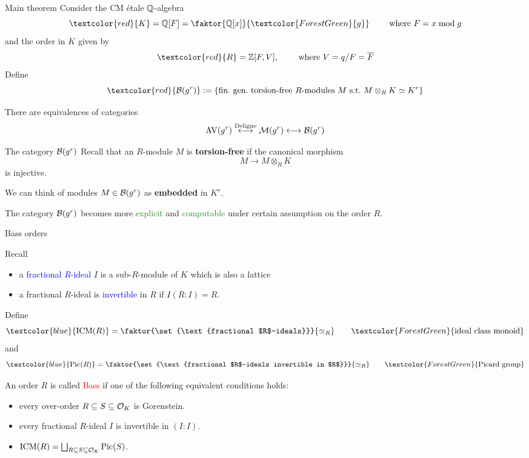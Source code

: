 \documentclass[usenames,dvipsnames]{beamer}
\DeclareMathOperator{\AV}{AV}
\newcommand{\red}[1]{\textcolor{red}{#1}}
\newcommand{\blue}[1]{\textcolor{blue}{#1}}
\newcommand{\green}[1]{\textcolor{ForestGreen}{#1}}
\begin{document}
\begin{frame}{ Main theorem}
Consider the CM \'etale $\mathbb{Q}$-algebra
\[ \red{K} = \Q[F] = \faktor{\Q[x]}{\green{g}} \qquad \text{ where }F=x \mod g \]
\pause and the order in $K$ given by
\[ \red{R} = \Z[F,V], \qquad \text{ where }V=q/F=\overline{F}\]
\pause Define
\[\red{\cB(g^r)}:=\set{ \text{fin.~gen.~torsion-free $R$-modules $M$ s.t.~$M\otimes_R K\simeq K^r$} } \]
\pause
\begin{thm}[M.]
 There are equivalences of categories
 \[ \AV(g^r) \overset{\text{Deligne}}{\longleftrightarrow} \cM(g^r) \longleftrightarrow \cB(g^r) \]
\end{thm}
\end{frame}

\begin{frame}{ The category ${\mathcal B}(g^r)$ }
Recall that an $R$-module $M$ is \textbf{torsion-free} if the canonical morphism
\[ M \to M\otimes_R K \]
is injective.

\pause We can think of modules $M\in {\mathcal B}(g^r)$ as \textbf{embedded} in $K^r$.

\pause The category ${\mathcal B}(g^r)$ becomes more \green{explicit} and \green{computable} under certain assumption on the order $R$.

\end{frame}

\begin{frame}{ Bass orders }

Recall 
\begin{itemize}
 \item a \blue{fractional $R$-ideal} $I$ is a sub-$R$-module of $K$ which is also a lattice
 \item a fractional $R$-ideal is \blue{invertible} in $R$ if $I(R:I) =R$.
\end{itemize}

Define
\[ \blue{\ICM(R)} = \faktor{\set{\text{fractional $R$-ideals}}}{\simeq_R}\qquad\green{\text{ideal class monoid}}\]
and
\[ \blue{\Pic(R)} = \faktor{\set{\text{fractional $R$-ideals invertible in $R$}}}{\simeq_R} \qquad\green{\text{Picard group}} \]

An order $R$ is called \red{Bass} if one of the following equivalent conditions holds:
\begin{itemize}
 \pause \item every over-order $R\subseteq S \subseteq {\mathcal O}_K$ is Gorenstein.
 \pause \item every fractional $R$-ideal $I$ is invertible in $(I:I)$.
 \pause \item $\operatorname{ICM}(R) = \bigsqcup_{R\subseteq S\subseteq {\mathcal O}_K} \operatorname{Pic}(S)$.
\end{itemize}

\end{frame}
\end{document}
